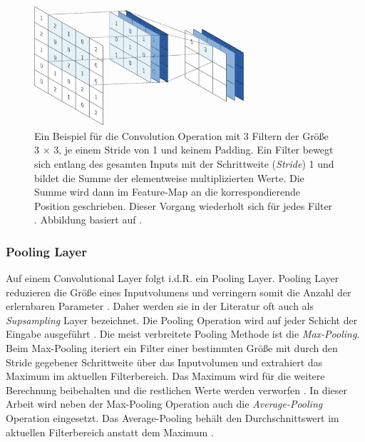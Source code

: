 \begin{figure}
	\centering
	\includegraphics[width=0.7\textwidth]{images/ann_conv/convolution_layer.png}
	\caption{Ein Beispiel für die Convolution Operation mit 3 Filtern der Größe 3 $\times$ 3, je einem Stride von 1 und keinem Padding. Ein Filter bewegt sich entlang des gesamten Inputs mit der Schrittweite (\textit{Stride}) 1 und bildet die Summe der elementweise multiplizierten Werte. Die Summe wird dann im Feature-Map an die korrespondierende Position geschrieben. Dieser Vorgang wiederholt sich für jedes Filter \cite{yamashitaConvolutionalNeuralNetworks2018}. Abbildung basiert auf \cite{yamashitaConvolutionalNeuralNetworks2018}.}
	\label{fig:convolution_layer}
\end{figure}

\subsubsection{Pooling Layer}
Auf einem Convolutional Layer folgt i.d.R. ein Pooling Layer. Pooling Layer reduzieren die Größe eines Inputvolumens und verringern somit die Anzahl der erlernbaren Parameter \cite{johnsonCS231nConvolutionalNeurala}. Daher werden sie in der Literatur oft auch als \textit{Supsampling} Layer bezeichnet. Die Pooling Operation wird auf jeder Schicht der Eingabe ausgeführt \cite{johnsonCS231nConvolutionalNeurala}. Die meist verbreitete Pooling Methode ist die \textit{Max-Pooling}. Beim Max-Pooling iteriert ein Filter einer bestimmten Größe mit durch den Stride gegebener Schrittweite über das Inputvolumen und extrahiert das Maximum im aktuellen Filterbereich. Das Maximum wird für die weitere Berechnung beibehalten und die restlichen Werte werden verworfen
 \cite{johnsonCS231nConvolutionalNeurala}. In dieser Arbeit wird neben der Max-Pooling Operation auch die \textit{Average-Pooling} Operation eingesetzt. Das Average-Pooling behält den Durchschnittswert im aktuellen Filterbereich anstatt dem Maximum \cite{johnsonCS231nConvolutionalNeurala}.
 
